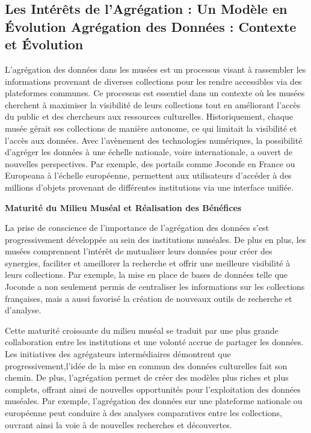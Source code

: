 \subsection{Les Intérêts de l'Agrégation : Un Modèle en Évolution
Agrégation des Données : Contexte et Évolution}

L'agrégation des données dans les musées est un processus visant à rassembler les informations provenant de diverses collections pour les rendre accessibles via des plateformes communes. Ce processus est essentiel dans un contexte où les musées cherchent à maximiser la visibilité de leurs collections tout en améliorant l'accès du public et des chercheurs aux ressources culturelles.
Historiquement, chaque musée gérait ses collections de manière autonome, ce qui limitait la visibilité et l'accès aux données. Avec l'avènement des technologies numériques, la possibilité d'agréger les données à une échelle nationale, voire internationale, a ouvert de nouvelles perspectives. Par exemple, des portails comme Joconde en France ou Europeana à l'échelle européenne, permettent aux utilisateurs d'accéder à des millions d'objets provenant de différentes institutions via une interface unifiée. \newline

\textbf{Maturité du Milieu Muséal et Réalisation des Bénéfices}\newline

La prise de conscience de l'importance de l'agrégation des données s'est progressivement développée au sein des institutions muséales. De plus en plus, les musées comprennent l’intérêt de mutualiser leurs données pour créer des synergies, faciliter et ameillorer la recherche et offrir une meilleure visibilité à leurs collections. Par exemple, la mise en place de bases de données telle que Joconde a non seulement permis de centraliser les informations sur les collections françaises, mais a aussi favorisé la création de nouveaux outils de recherche et d'analyse.\newline

Cette maturité croissante du milieu muséal se traduit par une plus grande collaboration entre les institutions et une volonté accrue de partager les données. Les initiatives des agrégateurs intermédiaires démontrent que progressivement,l'idée de la mise en commun des données culturelles fait son chemin. De plus, l'agrégation permet de créer des modèles plus riches et plus complets, offrant ainsi de nouvelles opportunités pour l'exploitation des données muséales. Par exemple, l'agrégation des données sur une plateforme nationale ou européenne peut conduire à des analyses comparatives entre les collections, ouvrant ainsi la voie à de nouvelles recherches et découvertes.\newline

